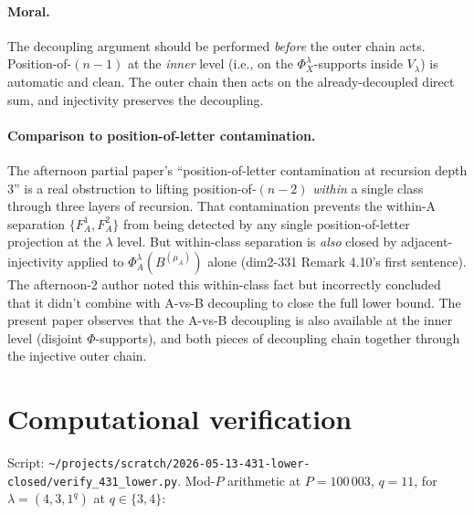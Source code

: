 \documentclass[11pt]{article}
\theoremstyle{definition}
\begin{document}
\paragraph{Moral.} The decoupling argument should be performed
\emph{before} the outer chain acts. Position-of-$(n-1)$ at the
\emph{inner} level (i.e., on the $\Phi_X^\lambda$-supports inside
$V_\lambda$) is automatic and clean. The outer chain then acts on
the already-decoupled direct sum, and injectivity preserves the
decoupling.

\paragraph{Comparison to position-of-letter contamination.} The
afternoon partial paper's ``position-of-letter contamination at
recursion depth 3'' is a real obstruction to lifting position-of-$(n-2)$
\emph{within} a single class through three layers of recursion. That
contamination prevents the within-A separation
$\{F_A^1, F_A^2\}$ from being detected by any single position-of-letter
projection at the $\lambda$ level. But within-class separation is
\emph{also} closed by adjacent-injectivity applied to
$\Phi_A^\lambda(B^{(\mu_A)})$ alone (dim2-331 Remark 4.10's first
sentence). The afternoon-2 author noted this within-class fact but
incorrectly concluded that it didn't combine with A-vs-B decoupling
to close the full lower bound. The present paper observes that the
A-vs-B decoupling is also available at the inner level (disjoint
$\Phi$-supports), and both pieces of decoupling chain together
through the injective outer chain.

\section{Computational verification}\label{sec:comp}

Script:
\texttt{\textasciitilde/projects/scratch/2026-05-13-431-lower-closed/verify\_431\_lower.py}.
Mod-$P$ arithmetic at $P = 100\,003$, $q = 11$, for
$\lambda = (4, 3, 1^q)$ at $q \in \{3, 4\}$:
\end{document}
